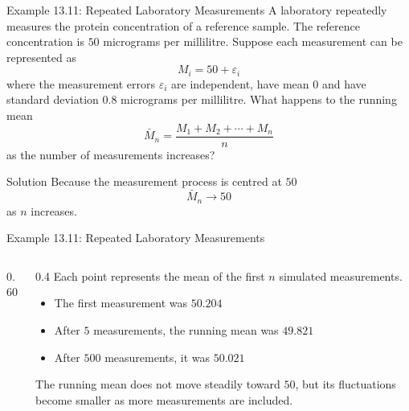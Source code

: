 \documentclass[aspectratio=169]{beamer}
\begin{document}
\begin{frame}{Example 13.11: Repeated Laboratory Measurements}
A laboratory repeatedly measures the protein concentration of a reference sample. The reference concentration is $50$ micrograms per millilitre. Suppose each measurement can be represented as
$$M_i=50+\varepsilon_i$$
where the measurement errors $\varepsilon_i$ are independent, have mean $0$ and have standard deviation $0.8$ micrograms per millilitre. What happens to the running mean
$$\bar{M}_n=\frac{M_1+M_2+\cdots+M_n}{n}$$
as the number of measurements increases?

\pause

\begin{block}{Solution}
Because the measurement process is centred at $50$
$$\bar{M}_n\longrightarrow50$$
as $n$ increases.
\end{block}
\end{frame}


\begin{frame}{Example 13.11: Repeated Laboratory Measurements}

\begin{columns}[T,onlytextwidth]
\begin{column}{0.60\textwidth}
\centering
{}

\end{column}

\begin{column}{0.4\textwidth}
Each point represents the mean of the first $n$ simulated measurements.
\begin{itemize}
	\item The first measurement was $50.204$
  	\item After $5$ measurements, the running mean was $49.821$
	\item After $500$ measurements, it was $50.021$
\end{itemize}

The running mean does not move steadily toward $50$, but its fluctuations become smaller as more measurements are included.
\end{column}
\end{columns}
\end{frame}
\end{document}
